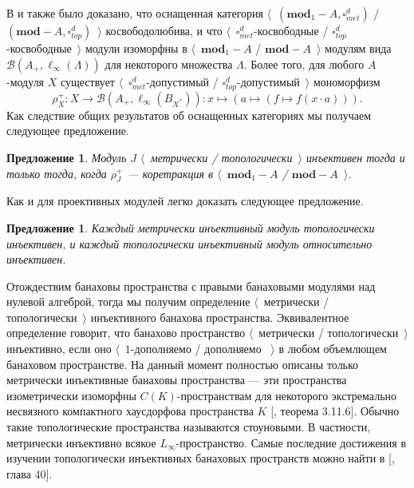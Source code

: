 \documentclass[12pt]{article}
\newtheorem{proposition}[theorem]{Предложение}
\begin{document}
В \cite{HelMetrFrQMod} и \cite{ShtTopFrClassicQuantMod} также было доказано, что оснащенная категория $\langle$~$(\mathbf{mod}_1-A,\square_{met}^d)$ / $(\mathbf{mod}-A,\square_{top}^d)$~$\rangle$ косвободолюбива, и что $\langle$~$\square_{met}^d$-косвободные / $\square_{top}^d$-косвободные~$\rangle$ модули изоморфны в $\langle$~$\mathbf{mod}_1-A$ / $\mathbf{mod}-A$~$\rangle$ модулям вида $\mathcal{B}(A_+, \ell_\infty(\Lambda))$ для некоторого множества $\Lambda$. Более того, для любого $A$-модуля $X$ существует $\langle$~$\square_{met}^d$-допустимый / $\square_{top}^d$-допустимый~$\rangle$ мономорфизм
$$
\rho_X^+:X\to\mathcal{B}(A_+,\ell_\infty(B_{X^*})):x\mapsto(a\mapsto(f\mapsto f(x\cdot a))).
$$
Как следствие общих результатов об оснащенных категориях мы получаем следующее предложение.

\begin{proposition}\label{MetTopInjModViaCanonicMorph}
Модуль $J$ $\langle$~метрически / топологически~$\rangle$ инъективен тогда и только тогда, когда $\rho_J^+$ --- коретракция в $\langle$~$\mathbf{mod}_1-A$ / $\mathbf{mod}-A$~$\rangle$.
\end{proposition}

Как и для проективных модулей легко доказать следующее предложение. 

\begin{proposition}\label{MetInjIsTopInjAndTopInjIsRelInj} Каждый метрически инъективный модуль топологически инъективен, и каждый топологически инъективный модуль относительно инъективен.
\end{proposition}

Отождествим банаховы пространства с правыми банаховыми модулями над нулевой алгеброй, тогда мы получим определение $\langle$~метрически / топологически~$\rangle$ инъективного банахова пространства. Эквивалентное определение говорит, что банахово пространство $\langle$~метрически / топологически~$\rangle$ инъективно, если оно $\langle$~$1$-дополняемо / дополняемо ~$\rangle$ в любом объемлющем банаховом пространстве. На данный момент полностью описаны только метрически инъективные банаховы пространства --- эти пространства изометрически изоморфны $C(K)$-пространствам для некоторого экстремально несвязного компактного хаусдорфова пространства $K$ [\cite{LaceyIsomThOfClassicBanSp}, теорема 3.11.6]. Обычно такие топологические пространства называются стоуновыми. В частности, метрически инъективно всякое $L_\infty$-пространство. Самые последние достижения в изучении топологически инъективных банаховых пространств можно найти в [\cite{JohnLinHandbookGeomBanSp}, глава 40].
\end{document}
